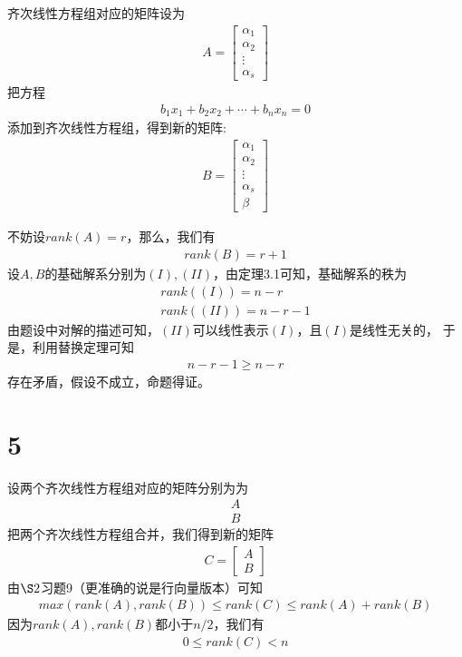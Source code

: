 \documentclass{article}
\begin{document}
齐次线性方程组对应的矩阵设为
\begin{align*}
  A = \begin{bmatrix}
        \alpha_1 \\
        \alpha_2 \\
        \vdots   \\
        \alpha_s
      \end{bmatrix}
\end{align*}
把方程
\begin{align*}
  b_1 x_1 + b_2 x_2 + \cdots + b_n x_n = 0
\end{align*}
添加到齐次线性方程组，得到新的矩阵:
\begin{align*}
  B = \begin{bmatrix}
        \alpha_1 \\
        \alpha_2 \\
        \vdots   \\
        \alpha_s \\
        \beta
      \end{bmatrix}
\end{align*}

不妨设$rank(A) = r$，那么，我们有
\begin{align*}
  rank(B) = r + 1
\end{align*}
设$A,B$的基础解系分别为$(I),(II)$，由定理3.1可知，基础解系的秩为
\begin{align*}
  rank((I)) = n - r \\
  rank((II)) = n - r - 1
\end{align*}
由题设中对解的描述可知，$(II)$可以线性表示$(I)$，且$(I)$是线性无关的，
于是，利用替换定理可知
\begin{align*}
  n - r - 1 \geq n - r
\end{align*}
存在矛盾，假设不成立，命题得证。

\section*{5}

设两个齐次线性方程组对应的矩阵分别为为
\begin{align*}
  A \\
  B
\end{align*}
把两个齐次线性方程组合并，我们得到新的矩阵
\begin{align*}
  C = \begin{bmatrix}
        A \\
        B
      \end{bmatrix}
\end{align*}
由$\S 2$习题9（更准确的说是行向量版本）可知
\begin{align*}
  max(rank(A), rank(B)) \leq rank(C) \leq rank(A) + rank(B)
\end{align*}
因为$rank(A), rank(B)$都小于$n/2$，我们有
\begin{align*}
  0 \leq rank(C) < n
\end{align*}
\end{document}
